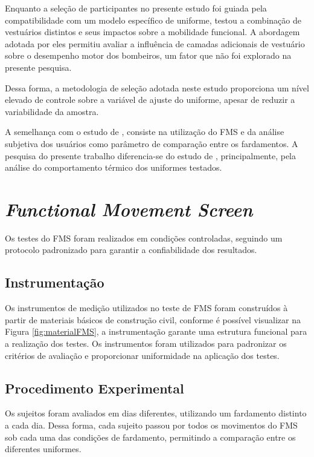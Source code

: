 Enquanto a seleção de participantes no presente estudo foi guiada pela compatibilidade com 
um modelo específico de uniforme, \textcite{orr2019impact} testou a combinação de vestuários 
distintos e seus impactos sobre a mobilidade funcional. A abordagem adotada por eles permitiu 
avaliar a influência de camadas adicionais de vestuário sobre o desempenho motor dos bombeiros, 
um fator que não foi explorado na presente pesquisa.

Dessa forma, a metodologia de seleção adotada neste estudo proporciona um nível elevado de 
controle sobre a variável de ajuste do uniforme, apesar de reduzir a variabilidade da amostra.

A semelhança com o estudo de \textcite{orr2019impact}, consiste na utilização do \acrshort{FMS} e 
da análise subjetiva dos usuários como parâmetro de comparação entre os fardamentos. A pesquisa 
do presente trabalho diferencia-se do estudo de \textcite{orr2019impact}, principalmente, 
pela análise do comportamento térmico dos uniformes testados.


\section{\textit{Functional Movement Screen}}

Os testes do \acrlong{FMS} foram realizados em condições controladas, seguindo um protocolo 
padronizado para garantir a confiabilidade dos resultados. 

\subsection{Instrumentação}
Os instrumentos de medição utilizados no teste de \acrshort{FMS} foram construídos à partir de materiais 
básicos de construção civil, conforme é possível visualizar na Figura \ref{fig:materialFMS}, a instrumentação 
garante uma estrutura funcional para a realização dos testes. 
Os instrumentos foram utilizados para padronizar os critérios de avaliação e proporcionar 
uniformidade na aplicação dos testes. 


\subsection{Procedimento Experimental}
Os sujeitos foram avaliados em dias diferentes, utilizando um fardamento distinto a cada dia. 
Dessa forma, cada sujeito passou por todos os movimentos do \acrshort{FMS} sob cada uma das condições 
de fardamento, permitindo a comparação entre os diferentes uniformes.

